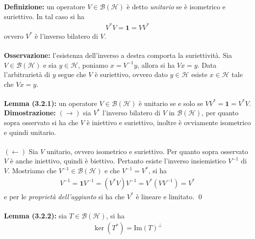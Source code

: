 \documentclass{article}
\numberwithin{equation}{subsection}
\begin{document}
\textbf{Definizione:} un operatore $V \in \mathcal{B}(\mathcal{H})$ è detto \textit{unitario} se è isometrico e suriettivo. In tal caso si ha 
\begin{align*}
    V^*V = \mathbf{1} = VV^* 
\end{align*}
ovvero $V^*$ è l'inverso bilatero di $V$. \\ \\
\textbf{Osservazione:} l'esistenza dell'inverso a destra comporta la suriettività. Sia $V \in \mathcal{B}(\mathcal{H})$ e sia $y \in \mathcal{H}$, poniamo $x = V^{-1}y$, allora si ha $Vx = y$. Data l'arbitrarietà di $y$ segue che $V$ è suriettivo, ovvero dato $y \in \mathcal{H}$ esiste $x \in \mathcal{H}$ tale che $Vx = y$. \\ \\
\textbf{Lemma (3.2.1):} un operatore $V \in \mathcal{B}(\mathcal{H})$ è unitario se e solo se $VV^* = \mathbf{1} = V^*V$. \\

\textbf{Dimostrazione:} $(\rightarrow)$ sia $V^*$ l'inverso bilatero di $V$ in $\mathcal{B}(\mathcal{H})$, per quanto sopra osservato si ha che $V$ è iniettivo e suriettivo, inoltre è ovviamente isometrico e quindi unitario.  \\ \\
$(\leftarrow)$ Sia $V$ unitario, ovvero isometrico e suriettivo. Per quanto sopra osservato $V$ è anche iniettivo, quindi è biettivo. Pertanto esiste l'inverso insiemistico $V^{-1}$ di $V$. Mostriamo che $V^{-1} \in \mathcal{B}(\mathcal{H})$ e che $V^{-1} = V^*$, si ha 
\begin{align*}
    V^{-1} = \mathbf{1}V^{-1} = (V^*V)V^{-1} = V^*(VV^{-1}) = V^* 
\end{align*}
e per le \textit{proprietà dell'aggiunto} si ha che $V^*$ è lineare e limitato. \qed \\ \\
\textbf{Lemma (3.2.2):} sia $T \in \mathcal{B}(\mathcal{H})$, si ha 
\begin{align*}
    \ker(T^*) = \mathrm{Im}(T)^\perp 
\end{align*} \\
\end{document}
